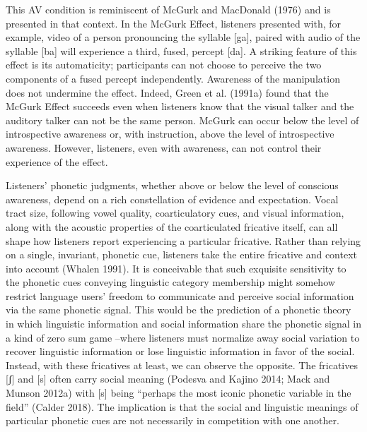 \documentclass[
  letterpaper,
  DIV=11,
  numbers=noendperiod]{scrartcl}
\begin{document}
This AV condition is reminiscent of McGurk and MacDonald (1976) and is
presented in that context. In the McGurk Effect, listeners presented
with, for example, video of a person pronouncing the syllable {[}ga{]},
paired with audio of the syllable {[}ba{]} will experience a third,
fused, percept {[}da{]}. A striking feature of this effect is its
automaticity; participants can not choose to perceive the two components
of a fused percept independently. Awareness of the manipulation does not
undermine the effect. Indeed, Green et al. (1991a) found that the McGurk
Effect succeeds even when listeners know that the visual talker and the
auditory talker can not be the same person. McGurk can occur below the
level of introspective awareness or, with instruction, above the level
of introspective awareness. However, listeners, even with awareness, can
not control their experience of the effect.

Listeners' phonetic judgments, whether above or below the level of
conscious awareness, depend on a rich constellation of evidence and
expectation. Vocal tract size, following vowel quality, coarticulatory
cues, and visual information, along with the acoustic properties of the
coarticulated fricative itself, can all shape how listeners report
experiencing a particular fricative. Rather than relying on a single,
invariant, phonetic cue, listeners take the entire fricative and context
into account (Whalen 1991). It is conceivable that such exquisite
sensitivity to the phonetic cues conveying linguistic category
membership might somehow restrict language users' freedom to communicate
and perceive social information via the same phonetic signal. This would
be the prediction of a phonetic theory in which linguistic information
and social information share the phonetic signal in a kind of zero sum
game --where listeners must normalize away social variation to recover
linguistic information or lose linguistic information in favor of the
social. Instead, with these fricatives at least, we can observe the
opposite. The fricatives {[}ʃ{]} and {[}s{]} often carry social meaning
(Podesva and Kajino 2014; Mack and Munson 2012a) with {[}s{]} being
``perhaps the most iconic phonetic variable in the field'' (Calder
2018). The implication is that the social and linguistic meanings of
particular phonetic cues are not necessarily in competition with one
another.
\end{document}
